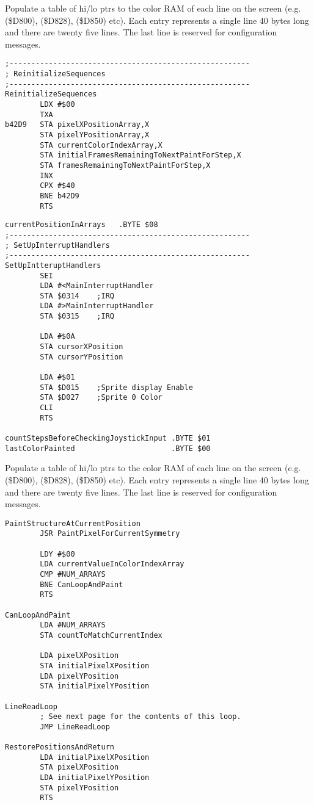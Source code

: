 Populate a table of hi/lo ptrs to the color RAM
of each line on the screen (e.g. \icode(\$D800), \icode(\$D828), \icode(\$D850) etc). Each entry represents a single
line 40 bytes long and there are twenty five lines.
The last line is reserved for configuration messages.



\clearpage
\begin{lstlisting}
;-------------------------------------------------------
; ReinitializeSequences
;-------------------------------------------------------
ReinitializeSequences   
        LDX #$00
        TXA 
b42D9   STA pixelXPositionArray,X
        STA pixelYPositionArray,X
        STA currentColorIndexArray,X
        STA initialFramesRemainingToNextPaintForStep,X
        STA framesRemainingToNextPaintForStep,X
        INX 
        CPX #$40
        BNE b42D9
        RTS 

\end{lstlisting}
\begin{lstlisting}
currentPositionInArrays   .BYTE $08 
;-------------------------------------------------------
; SetUpInterruptHandlers
;-------------------------------------------------------
SetUpIntteruptHandlers   
        SEI 
        LDA #<MainInterruptHandler
        STA $0314    ;IRQ
        LDA #>MainInterruptHandler
        STA $0315    ;IRQ

        LDA #$0A
        STA cursorXPosition
        STA cursorYPosition

        LDA #$01
        STA $D015    ;Sprite display Enable
        STA $D027    ;Sprite 0 Color
        CLI 
        RTS 

countStepsBeforeCheckingJoystickInput .BYTE $01
lastColorPainted                      .BYTE $00
\end{lstlisting}
\clearpage

Populate a table of hi/lo ptrs to the color RAM
of each line on the screen (e.g. \icode(\$D800), \icode(\$D828), \icode(\$D850) etc). Each entry represents a single
line 40 bytes long and there are twenty five lines.
The last line is reserved for configuration messages.


\clearpage
\begin{lstlisting}
PaintStructureAtCurrentPosition   
        JSR PaintPixelForCurrentSymmetry

        LDY #$00
        LDA currentValueInColorIndexArray
        CMP #NUM_ARRAYS
        BNE CanLoopAndPaint
        RTS 

CanLoopAndPaint   
        LDA #NUM_ARRAYS
        STA countToMatchCurrentIndex
       
        LDA pixelXPosition
        STA initialPixelXPosition
        LDA pixelYPosition
        STA initialPixelYPosition

LineReadLoop   
        ; See next page for the contents of this loop.
        JMP LineReadLoop

RestorePositionsAndReturn   
        LDA initialPixelXPosition
        STA pixelXPosition
        LDA initialPixelYPosition
        STA pixelYPosition
        RTS 

\end{lstlisting}
\clearpage

